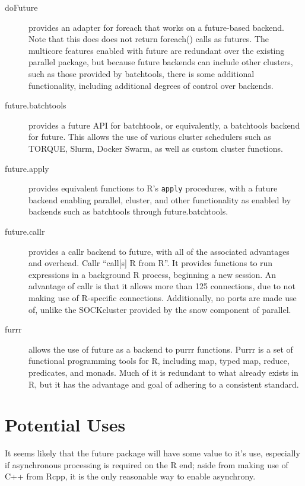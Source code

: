\documentclass[10pt,a4paper]{article}
\begin{document}
\begin{description}
\item[doFuture]\cite{bengtsson20do} provides an adapter for
  foreach\cite{microsoft20} that works on a future-based backend. Note
  that this does does not return foreach() calls as futures. The
  multicore features enabled with future are redundant over the
  existing parallel package, but because future backends can include
  other clusters, such as those provided by batchtools, there is some
  additional functionality, including additional degrees of control
  over backends.
\item[future.batchtools]\cite{bengtsson19batch} provides a future API
  for batchtools\cite{lang17}, or equivalently, a batchtools backend
  for future. This allows the use of various cluster schedulers such
  as TORQUE, Slurm, Docker Swarm, as well as custom cluster functions.
\item[future.apply]\cite{bengtsson20apply} provides equivalent
  functions to R's \texttt{apply} procedures, with a future backend
  enabling parallel, cluster, and other functionality as enabled by
  backends such as batchtools through future.batchtools.
\item[future.callr]\cite{bengtsson19callr} provides a
  callr\cite{csárdi20} backend to future, with all of the associated
  advantages and overhead. Callr \enquote{call[s] R from R}. It
  provides functions to run expressions in a background R process,
  beginning a new session. An advantage of callr is that it allows
  more than 125 connections, due to not making use of R-specific
  connections. Additionally, no ports are made use of, unlike the
  SOCKcluster provided by the snow component of parallel.
\item[furrr]\cite{vaughan18} allows the use of future as a backend to
  purrr functions. Purrr is a set of functional programming tools for
  R, including map, typed map, reduce, predicates, and monads. Much of
  it is redundant to what already exists in R, but it has the
  advantage and goal of adhering to a consistent standard.
\end{description}

\section{Potential Uses}
\label{sec:potential-uses}

It seems likely that the future package will have some value to it's
use, especially if asynchronous processing is required on the R end;
aside from making use of C++ from Rcpp, it is the only reasonable way
to enable asynchrony.

\printbibliography{}
\end{document}
